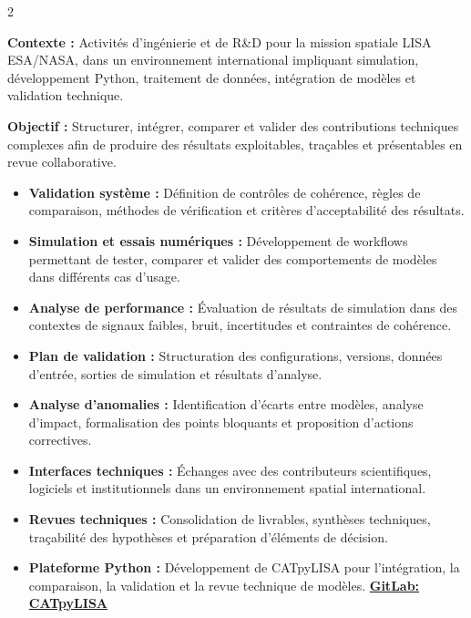 \documentclass[8pt,a4paper,ragged2e,withhyper]{altacv}
\begin{document}
\begin{paracol}{2}
\divider


\textbf{Contexte :} Activités d’ingénierie et de R\&D pour la mission spatiale LISA ESA/NASA, dans un environnement international impliquant simulation, développement Python, traitement de données, intégration de modèles et validation technique.

\textbf{Objectif :} Structurer, intégrer, comparer et valider des contributions techniques complexes afin de produire des résultats exploitables, traçables et présentables en revue collaborative.

\begin{itemize}
  \item \textbf{Validation système :} Définition de contrôles de cohérence, règles de comparaison, méthodes de vérification et critères d’acceptabilité des résultats.
  \item \textbf{Simulation et essais numériques :} Développement de workflows permettant de tester, comparer et valider des comportements de modèles dans différents cas d’usage.
  \item \textbf{Analyse de performance :} Évaluation de résultats de simulation dans des contextes de signaux faibles, bruit, incertitudes et contraintes de cohérence.
  \item \textbf{Plan de validation :} Structuration des configurations, versions, données d’entrée, sorties de simulation et résultats d’analyse.
  \item \textbf{Analyse d’anomalies :} Identification d’écarts entre modèles, analyse d’impact, formalisation des points bloquants et proposition d’actions correctives.
  \item \textbf{Interfaces techniques :} Échanges avec des contributeurs scientifiques, logiciels et institutionnels dans un environnement spatial international.
  \item \textbf{Revues techniques :} Consolidation de livrables, synthèses techniques, traçabilité des hypothèses et préparation d’éléments de décision.
  \item \textbf{Plateforme Python :} Développement de CATpyLISA pour l’intégration, la comparaison, la validation et la revue technique de modèles.
  \textcolor{DarkPastelRed}{\href{https://gitlab.oca.eu/gboileau/lisa_l3_tools}{\bf GitLab: CATpyLISA}}
\end{itemize}


\end{paracol}
\end{document}
